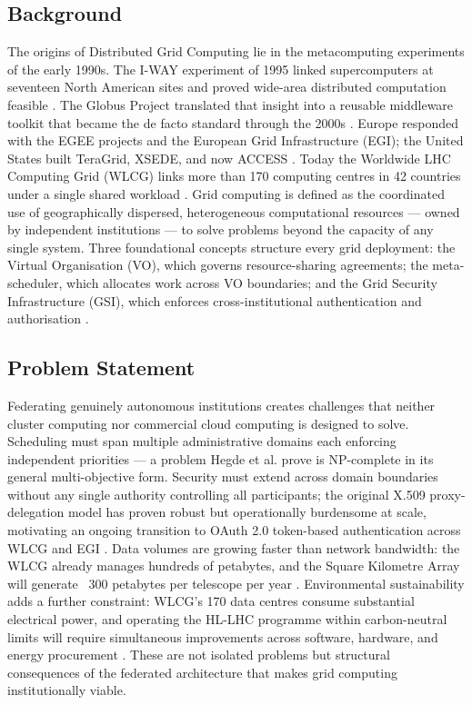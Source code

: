 \documentclass[12pt,a4paper]{report}
\begin{document}
\subsection*{Background}
The origins of Distributed Grid Computing lie in the metacomputing experiments of the early 1990s. The I-WAY experiment of 1995 linked supercomputers 
at seventeen North American sites and proved wide-area distributed computation feasible \parencite{foster1998}. The Globus Project translated that
 insight into a reusable middleware toolkit that became the de facto standard through the 2000s \parencite{foster1997}. Europe responded with the 
 EGEE projects and the European Grid Infrastructure (EGI); the United States built TeraGrid, XSEDE, and now ACCESS \parencite{boerner2023access}. Today the 
 Worldwide LHC Computing Grid (WLCG) links more than 170 computing centres in 42 countries under a single shared workload \parencite{atlas2025software}.
  Grid computing is defined as the coordinated use of geographically dispersed, heterogeneous computational resources — owned by independent 
  institutions — to solve problems beyond the capacity of any single system. Three foundational concepts structure every grid deployment: the 
  Virtual Organisation (VO), which governs resource-sharing agreements; the meta-scheduler, which allocates work across VO boundaries; and the 
  Grid Security Infrastructure (GSI), which enforces cross-institutional authentication and authorisation \parencite{foster1998}.

\subsection*{Problem Statement}
Federating genuinely autonomous institutions creates challenges that neither cluster computing nor commercial cloud computing is designed to solve. 
Scheduling must span multiple administrative domains each enforcing independent priorities — a problem Hegde et al. \parencite{hegde2024} prove is NP-complete 
in its general multi-objective form. Security must extend across domain boundaries without any single authority controlling all participants; 
the original X.509 proxy-delegation model has proven robust but operationally burdensome at scale, motivating an ongoing transition to 
OAuth 2.0 token-based authentication across WLCG and EGI \parencite{dack2024wlcg}. Data volumes are growing faster than network bandwidth: 
the WLCG already manages hundreds of petabytes, and the Square Kilometre Array will generate ~300 petabytes per telescope per year \parencite{scaife2020}. 
Environmental sustainability adds a further constraint: WLCG’s 170 data centres consume substantial electrical power, and operating the HL-LHC
 programme within carbon-neutral limits will require simultaneous improvements across software, hardware, and energy procurement \parencite{britton2024energy}.
  These are not isolated problems but structural consequences of the federated architecture that makes grid computing institutionally viable.
\end{document}
